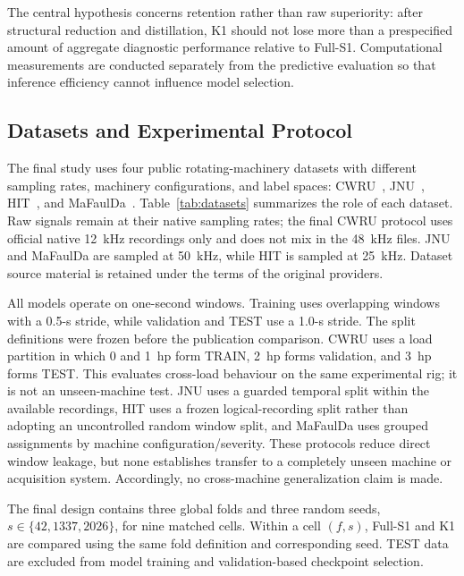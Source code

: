 

The central hypothesis concerns retention rather than raw superiority: after structural reduction and distillation, K1 should not lose more than a prespecified amount of aggregate diagnostic performance relative to Full-S1. Computational measurements are conducted separately from the predictive evaluation so that inference efficiency cannot influence model selection.

\subsection{Datasets and Experimental Protocol}
\label{subsec:datasets}

The final study uses four public rotating-machinery datasets with different sampling rates, machinery configurations, and label spaces: CWRU~\citep{CWRUDataset}, JNU~\citep{JNUDataset}, HIT~\citep{Hou2023HIT}, and MaFaulDa~\citep{MaFaulDaDataset}. Table~\ref{tab:datasets} summarizes the role of each dataset. Raw signals remain at their native sampling rates; the final CWRU protocol uses official native 12~kHz recordings only and does not mix in the 48~kHz files. JNU and MaFaulDa are sampled at 50~kHz, while HIT is sampled at 25~kHz. Dataset source material is retained under the terms of the original providers.



All models operate on one-second windows. Training uses overlapping windows with a 0.5-s stride, while validation and TEST use a 1.0-s stride. The split definitions were frozen before the publication comparison. CWRU uses a load partition in which 0 and 1~hp form TRAIN, 2~hp forms validation, and 3~hp forms TEST. This evaluates cross-load behaviour on the same experimental rig; it is not an unseen-machine test. JNU uses a guarded temporal split within the available recordings, HIT uses a frozen logical-recording split rather than adopting an uncontrolled random window split, and MaFaulDa uses grouped assignments by machine configuration/severity. These protocols reduce direct window leakage, but none establishes transfer to a completely unseen machine or acquisition system. Accordingly, no cross-machine generalization claim is made.

The final design contains three global folds and three random seeds, $s\in\{42,1337,2026\}$, for nine matched cells. Within a cell $(f,s)$, Full-S1 and K1 are compared using the same fold definition and corresponding seed. TEST data are excluded from model training and validation-based checkpoint selection.

